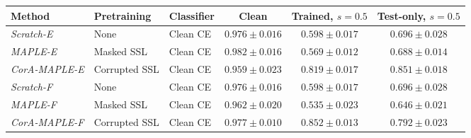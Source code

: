 \begin{tabular*}{\textwidth}{@{\extracolsep{\fill}}lllccc@{}}
\toprule
Method & Pretraining & Classifier & Clean & Trained, $s=0.5$ & Test-only, $s=0.5$ \\
\midrule
\emph{Scratch-E} & None & Clean CE & $0.976\pm0.016$ & $0.598\pm0.017$ & $0.696\pm0.028$ \\
\emph{MAPLE-E} & Masked SSL & Clean CE & $0.982\pm0.016$ & $0.569\pm0.012$ & $0.688\pm0.014$ \\
\emph{CorA-MAPLE-E} & Corrupted SSL & Clean CE & $0.959\pm0.023$ & $0.819\pm0.017$ & $0.851\pm0.018$ \\
\emph{Scratch-F} & None & Clean CE & $0.976\pm0.016$ & $0.598\pm0.017$ & $0.696\pm0.028$ \\
\emph{MAPLE-F} & Masked SSL & Clean CE & $0.962\pm0.020$ & $0.535\pm0.023$ & $0.646\pm0.021$ \\
\emph{CorA-MAPLE-F} & Corrupted SSL & Clean CE & $0.977\pm0.010$ & $0.852\pm0.013$ & $0.792\pm0.023$ \\
\bottomrule
\end{tabular*}
